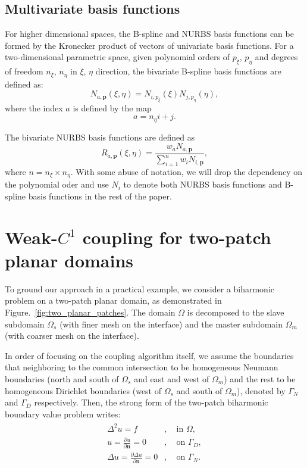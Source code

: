 \documentclass[preprint,12pt]{elsarticle}
\theoremstyle{remark}
\begin{document}
\subsection{Multivariate basis functions}
For higher dimensional spaces, the B-spline and NURBS basis functions can be formed by the Kronecker product of vectors of univariate basis functions. For a two-dimensional parametric space, given polynomial orders of $p_\xi$, $p_\eta$ and degrees of freedom $n_\xi$, $n_\eta$ in $\xi$, $\eta$ direction, the bivariate B-spline basis functions are defined as:
\begin{equation}
N_{a,\mathbf{p}}(\xi,\eta)=N_{i,p_\xi}(\xi)N_{j,p_\eta}(\eta),
\end{equation}
where the index $a$ is defined by the map
\begin{equation}
a=n_\eta{i}+j.
\end{equation}\par
The bivariate NURBS basis functions are defined as
\begin{equation}
    R_{a,\mathbf{p}}(\xi,\eta)=\frac{w_{a}N_{a,\mathbf{p}}}{\sum_{i=1}^{n}{w_{i}N_{i,\mathbf{p}}}},
\end{equation}
where $n=n_\xi\times{}n_\eta$. 
With some abuse of notation, we will drop the dependency on the polynomial oder and use $N_{i}$ to denote both NURBS basis functions and B-spline basis functions in the rest of the paper.\par
\section{Weak-$C^1$ coupling for two-patch planar domains}
To ground our approach in a practical example, we consider a biharmonic problem on a two-patch planar domain, as demonstrated in Figure.~\ref{fig:two_planar_patches}. The domain $\Omega$ is decomposed to the slave subdomain $\Omega_s$ (with finer mesh on the interface) and the master subdomain $\Omega_m$ (with coarser mesh on the interface). \par
In order of focusing on the coupling algorithm itself, we assume the boundaries that neighboring to the common intersection to be homogeneous Neumann boundaries (north and south of $\Omega_s$ and east and west of $\Omega_m$) and the rest to be homogeneous Dirichlet boundaries (west of $\Omega_s$ and south of $\Omega_m$), denoted by $\Gamma_N$ and $\Gamma_D$ respectively. Then, the strong form of the two-patch biharmonic boundary value problem writes:
\begin{align}
    \begin{split}
        \Delta^2u=f&,\quad \text{in }\Omega, \\
        u=\frac{\partial{u}}{\partial{\mathbf{n}}}=0&, \quad \text{on }\Gamma_D, \\
        \Delta{u}=\frac{\partial{\Delta{u}}}{\partial{\mathbf{n}}}=0&, \quad \text{on }\Gamma_N.
    \end{split}\label{eq:strong_biharmonic}
\end{align}
\end{document}
